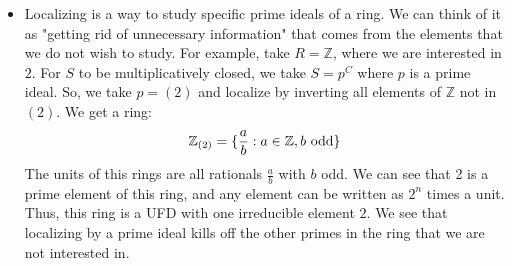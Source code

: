 \documentclass[11pt, oneside]{amsart}   	%
\theoremstyle{definition}
\begin{document}
\begin{itemize}
	\item Localizing is a way to study specific prime ideals of a ring. We can think of it as "getting rid of unnecessary information" that comes from 
	the elements that we do not wish to study. For example, take $R = \mathbb Z$, where we are interested in $2$. For 
	$S$ to be multiplicatively closed, we take $S = p^C$ where $p$ is a prime ideal. So, we take $p = (2)$ and localize by inverting all elements of 
	$\mathbb Z$ not in $(2)$. We get a ring:
	$$
		\mathbb Z_{(2)} = \{\frac{a}{b} : a\in\mathbb Z, b \textnormal{ odd}\}
	$$
	The units of this rings are all rationals $\frac{a}{b}$ with $b$ odd. We can see that 2 is a prime element of this ring, and any element can be 
	written as $2^n$ times a unit. Thus, this ring is a UFD with one irreducible element $2$. We see that localizing by a prime ideal kills off the other 
	primes in the ring that we are not interested in.

\end{itemize}
\end{document}
